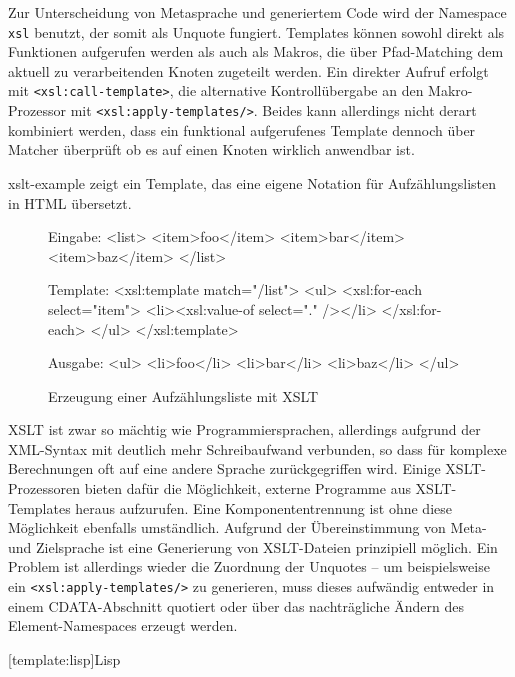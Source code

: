 \documentclass[12pt, a4paper, bibgerm]{scrbook}
\newenvironment{DIFnomarkup}{}{}
\newcommand\icode[1]{\lstinline?#1?}
\newcommand\lsection{}
\newcommand\abb{}
\begin{document}
Zur Unterscheidung von Metasprache und generiertem Code wird der
Namespace \icode{xsl} benutzt, der somit als Unquote fungiert. Templates
können sowohl direkt als Funktionen aufgerufen werden als auch als Makros,
die über Pfad-Matching dem aktuell zu verarbeitenden Knoten zugeteilt
werden. Ein direkter Aufruf erfolgt mit \icode{<xsl:call-template>},
die alternative Kontrollübergabe an den Makro-Prozessor mit
\icode{<xsl:apply-templates/>}. Beides kann allerdings nicht derart
kombiniert werden, dass ein funktional aufgerufenes Template dennoch
über Matcher überprüft ob es auf einen Knoten wirklich anwendbar ist.

\abb{xslt-example} zeigt ein Template, das eine eigene Notation für
Aufzählungslisten in HTML übersetzt.
\begin{figure}
  \centering
  \begin{DIFnomarkup}\begin{code}
Eingabe:
<list>
  <item>foo</item>
  <item>bar</item>
  <item>baz</item>
</list>

Template:
<xsl:template match="/list">
  <ul>
    <xsl:for-each select="item">
      <li><xsl:value-of select="." /></li>
    </xsl:for-each>
  </ul>
</xsl:template>    

Ausgabe:
<ul>
  <li>foo</li>
  <li>bar</li>
  <li>baz</li>
</ul>
  \end{code}\end{DIFnomarkup} %
  \caption{Erzeugung einer Aufzählungsliste mit XSLT}
  \label{magicl:fig:xslt-example}
\end{figure}

XSLT ist zwar so mächtig wie Programmiersprachen, allerdings aufgrund
der XML-Syntax mit deutlich mehr Schreibaufwand verbunden, so dass für
komplexe Berechnungen oft auf eine andere Sprache zurückgegriffen
wird. Einige XSLT-Prozessoren bieten dafür die Möglichkeit, externe
Programme aus XSLT-Templates heraus aufzurufen. Eine Komponententrennung
ist ohne diese Möglichkeit ebenfalls umständlich. Aufgrund der
Übereinstimmung von Meta- und Zielsprache ist eine Generierung von
XSLT-Dateien prinzipiell möglich. Ein Problem ist allerdings wieder die
Zuordnung der Unquotes -- um beispielsweise ein
\icode{<xsl:apply-templates/>} zu generieren, muss dieses aufwändig
entweder in einem CDATA-Abschnitt quotiert oder über das nachträgliche
Ändern des Element-Namespaces erzeugt werden.

\lsection[template:lisp]{Lisp}
\end{document}
